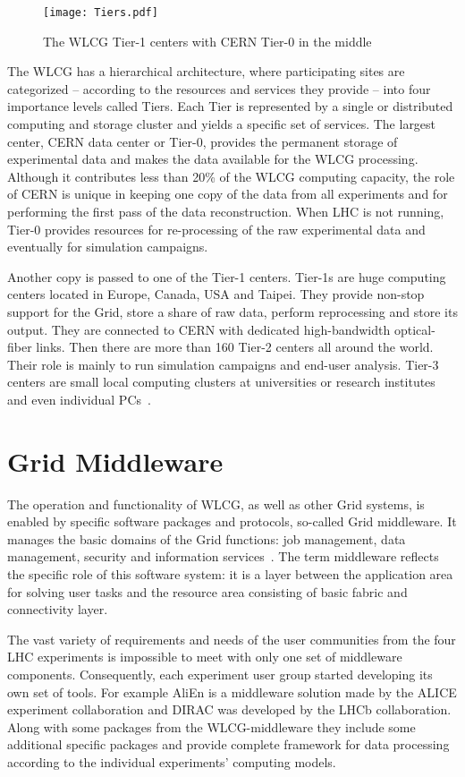 \begin{wrapfigure}{L}{0.6\textwidth}
\centering
\texttt{[image: Tiers.pdf]}
\caption{The WLCG Tier-1 centers with CERN Tier-0 in the middle}
\label{fig:WLCG}
\end{wrapfigure}

The WLCG has a hierarchical architecture, where participating sites are categorized -- according to the resources 
and services they provide -- into four importance levels called Tiers. Each Tier is represented by a single or 
distributed computing and storage cluster and yields a specific set of services. The largest center, CERN data 
center or Tier-0, provides the  permanent storage of experimental data and makes the data available for the WLCG 
processing. Although it contributes less than 20\% of the WLCG computing capacity, the role of CERN is unique in 
keeping one copy of the data from all experiments and for performing the first pass of the data reconstruction. 
When LHC is not running, Tier-0 provides resources for re-processing of the raw experimental data and eventually 
for simulation campaigns. 

Another copy is passed to one of the Tier-1 centers. Tier-1s are huge computing centers located in Europe, Canada, USA 
and Taipei. They provide non-stop support for the Grid, store a share of raw data, perform reprocessing and store 
its output. They are connected to CERN with dedicated high-bandwidth optical-fiber links. Then there are more than 
160 Tier-2 centers all around the world. Their role is mainly to run simulation campaigns and end-user analysis. 
Tier-3 centers are small local computing clusters at universities or research institutes and even individual 
PCs~\cite{TGrid}.

\section*{Grid Middleware}

The operation and functionality of WLCG, as well as other Grid systems, is enabled by specific software packages 
and protocols, so-called Grid middleware. It manages the basic domains of the Grid functions: job management, 
data management, security and information services~\cite{GriCom}. The term middleware reflects the specific role 
of this software system: it is a layer between the application area for solving user tasks 
and the resource area consisting of basic fabric and connectivity layer. 

The vast variety of requirements and needs of the user communities from the four LHC experiments is impossible to 
meet with only one set of middleware components. Consequently, each experiment user group started developing its 
own set of tools. For example AliEn is a middleware solution made by the 
ALICE experiment collaboration and DIRAC was developed by the 
LHCb collaboration. Along with some packages from the WLCG-middleware 
they include some additional specific packages and provide complete framework for data processing according to the 
individual experiments' computing models.

